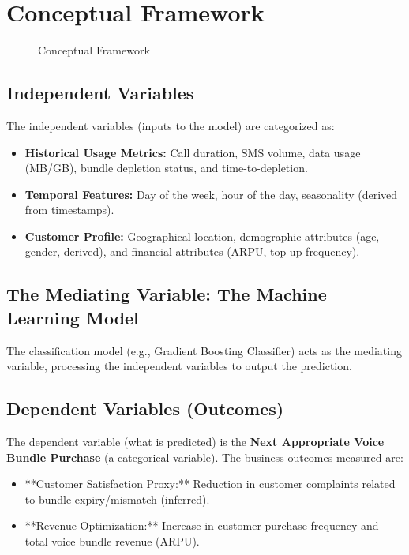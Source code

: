 \documentclass[12pt, a4paper]{report}
\begin{document}
\section{Conceptual Framework}
\begin{figure}[H]
  \centering
  \caption{Conceptual Framework}
  \label{fig:framework}
\end{figure}

\subsection{Independent Variables}
The independent variables (inputs to the model) are categorized as:
\begin{itemize}
    \item \textbf{Historical Usage Metrics:} Call duration, SMS volume, data usage (MB/GB), bundle depletion status, and time-to-depletion.
    \item \textbf{Temporal Features:} Day of the week, hour of the day, seasonality (derived from timestamps).
    \item \textbf{Customer Profile:} Geographical location, demographic attributes (age, gender, derived), and financial attributes (ARPU, top-up frequency).
\end{itemize}

\subsection{The Mediating Variable: The Machine Learning Model}
The classification model (e.g., Gradient Boosting Classifier) acts as the mediating variable, processing the independent variables to output the prediction.

\subsection{Dependent Variables (Outcomes)}
The dependent variable (what is predicted) is the \textbf{Next Appropriate Voice Bundle Purchase} (a categorical variable). The business outcomes measured are:
\begin{itemize}
    \item **Customer Satisfaction Proxy:** Reduction in customer complaints related to bundle expiry/mismatch (inferred).
    \item **Revenue Optimization:** Increase in customer purchase frequency and total voice bundle revenue (ARPU).
\end{itemize}
\clearpage
\end{document}
